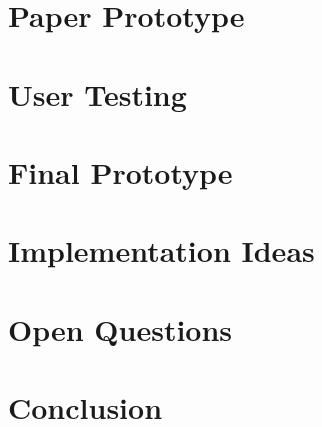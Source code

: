 \documentclass[runningheads]{llncs}
\begin{document}
\section{Paper Prototype}

\section{User Testing}

\section{Final Prototype}

\section{Implementation Ideas}

\section{Open Questions}

\section{Conclusion}

%

\end{document}
